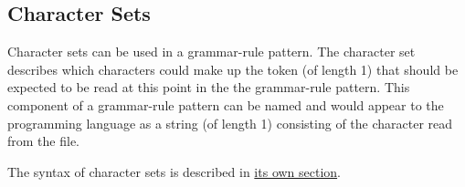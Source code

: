 
\subsection{Character Sets}
{
	Character sets can be used in a grammar-rule pattern.
	The character set describes which characters could make up the
	token (of length 1) that should be
	expected
	to be read at this point in the the grammar-rule pattern.
	This component of a grammar-rule pattern can be named and would appear to
	the programming language as a string (of length 1) consisting of
	the character read from the file.
	
	The syntax of character sets is described in
	\hyperref[sec:charset]{its own section}.
}
